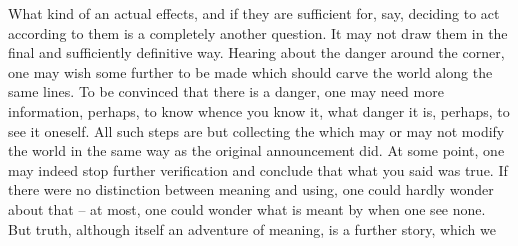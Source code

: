What kind of  an actual  effects, and if they are
sufficient for, say, deciding to act according to them is a completely another
question.  It may not draw them in the final and sufficiently definitive way.
Hearing about the danger around the corner, one may wish some further
 to be made which should carve the world along the same lines.
To be convinced that there is  a danger, one may need more
information, perhaps, to know whence you know it, what danger it is, perhaps, to
 see it oneself.  All such steps are but collecting the
 which may or may not modify the world in the same way as the
original announcement did. At some point, one may indeed stop further
verification and conclude that what you said was true.  If there were no
distinction between meaning and using, one could hardly wonder about that -- at
most, one could wonder what is meant by  when one see none.  But
truth, although itself an adventure of meaning, is a further story, which we
